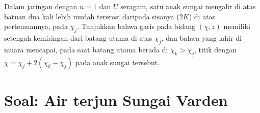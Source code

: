 \begin{exercise}[$\star\star\star$]\label{exo:b3:quantitative-geomorphology:12}
Dalam jaringan dengan $n = 1$ dan $U$ seragam, satu anak sungai mengalir di atas batuan dua kali
lebih mudah tererosi daripada sisanya ($2K$) di atas pertemuannya, pada $\chi_j$. Tunjukkan bahwa
garis  pada bidang $(\chi, z)$ memiliki setengah kemiringan dari
batang utama di atas $\chi_j$, dan bahwa  yang lahir di muara mencapai,
pada saat  batang utama berada di $\chi_k > \chi_j$, titik
dengan $\chi = \chi_j + 2(\chi_k - \chi_j)$ pada anak sungai tersebut.
\end{exercise}

\section{Soal: Air terjun Sungai Varden}

